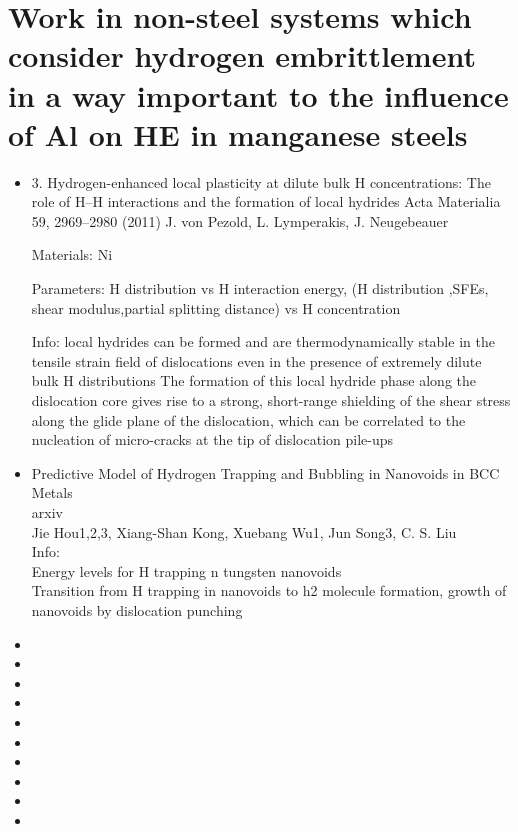 \documentclass[11pt,floatfix,showpacs]{amsart}
\newcommand{\se}{\section}
\begin{document}
\se{Work in non-steel systems which consider hydrogen embrittlement in a way important to the influence of Al on HE in manganese steels}
\begin{itemize}
\item 3.	Hydrogen-enhanced local plasticity at dilute bulk H concentrations: The role of H–H interactions and the formation of local hydrides 
Acta Materialia 59, 2969–2980 (2011)  
J. von Pezold, L. Lymperakis, J. Neugebeauer

Materials:  Ni

Parameters: H distribution vs H interaction energy, (H distribution ,SFEs, shear modulus,partial splitting distance) vs H concentration

Info: local hydrides can be formed and are thermodynamically stable in the tensile strain field of dislocations even in the presence of extremely dilute bulk H distributions The formation of this local hydride phase along the dislocation core gives rise to a strong, short-range shielding of the shear stress along the glide plane of the dislocation, which can be correlated to the nucleation of micro-cracks at the tip of dislocation pile-ups


\item Predictive Model of Hydrogen Trapping and Bubbling in Nanovoids in BCC Metals\\
arxiv \\
Jie Hou1,2,3, Xiang-Shan Kong, Xuebang Wu1, Jun Song3, C. S. Liu\\
Info:\\
Energy levels for H trapping n tungsten nanovoids\\
Transition from H trapping in nanovoids to h2 molecule formation, growth of nanovoids by dislocation punching

\item
\item
\item
\item
\item
\item
\item
\item
\item
\item
\end{itemize}



\end{document}
